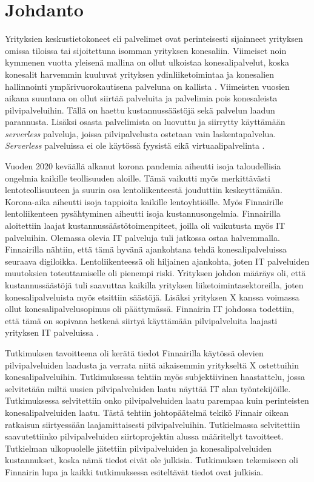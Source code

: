 \chapter{Johdanto\label{johdanto}}
Yrityksien keskustietokoneet eli palvelimet ovat perinteisesti sijainneet yrityksen omissa tiloissa tai sijoitettuna isomman yrityksen konesaliin. Viimeiset noin kymmenen vuotta yleisenä mallina on ollut ulkoistaa konesalipalvelut, koska konesalit harvemmin kuuluvat yrityksen ydinliiketoimintaa ja konesalien hallinnointi ympärivuorokautisena palveluna on kallista \citep{data_center_outsourcing}. Viimeisten vuosien aikana suuntana on ollut siirtää palveluita ja palvelimia pois konesaleista pilvipalveluihin. Tällä on haettu kustannussäästöjä sekä palvelun laadun parannusta. Lisäksi osasta palvelimista on luovuttu ja siirrytty käyttämään \emph{serverless} palveluja, joissa pilvipalvelusta ostetaan vain laskentapalvelua. \emph{Serverless} palveluissa ei ole käytössä fyysistä eikä virtuaalipalvelinta \citep{serverless_computing}.


Vuoden 2020 keväällä alkanut korona pandemia aiheutti isoja taloudellisia ongelmia kaikille teollisuuden aloille. Tämä vaikutti myös merkittävästi lentoteollisuuteen ja suurin osa lentoliikenteestä jouduttiin keskeyttämään. Korona-aika aiheutti isoja tappioita kaikille lentoyhtiöille. Myös Finnairille lentoliikenteen pysähtyminen aiheutti isoja kustannusongelmia. Finnairilla aloitettiin laajat kustannussäästötoimenpiteet, joilla oli vaikutusta myös IT palveluihin. Olemassa olevia IT palveluja tuli jatkossa ostaa halvemmalla. Finnairilla nähtiin, että tämä hyvänä ajankohtana tehdä konesalipalveluissa seuraava digiloikka. Lentoliikenteessä oli hiljainen ajankohta, joten IT palveluiden muutoksien toteuttamiselle oli pienempi riski. Yrityksen johdon määräys oli, että kustannussäästöjä tuli saavuttaa kaikilla yrityksen liiketoimintasektoreilla, joten konesalipalveluista myös etsittiin säästöjä. Lisäksi yrityksen X kanssa voimassa ollut konesalipalvelusopimus oli päättymässä. Finnairin IT johdossa todettiin, että tämä on sopivana hetkenä siirtyä käyttämään pilvipalveluita laajasti yrityksen IT palveluissa \citep{finnair_use_ibm}.

Tutkimuksen tavoitteena oli kerätä tiedot Finnairilla käytössä olevien pilvipalveluiden laadusta ja verrata niitä aikaisemmin yritykseltä X ostettuihin konesalipalveluihin. Tutkimuksessa tehtiin myös subjektiivinen haastattelu, jossa selvitetään miltä uusien pilvipalveluiden laatu näyttää IT alan työntekijöille. Tutkimuksessa selvitettiin onko pilvipalveluiden laatu parempaa kuin perinteisten konesalipalveluiden laatu. Tästä tehtiin johtopäätelmä tekikö Finnair oikean ratkaisun siirtyessään laajamittaisesti pilvipalveluihin. Tutkielmassa selvitettiin saavutettiinko pilvipalveluiden siirtoprojektin alussa määritellyt tavoitteet. Tutkielman ulkopuolelle jätettiin pilvipalveluiden ja konesalipalveluiden kustannukset, koska nämä tiedot eivät ole julkisia. Tutkimuksen tekemiseen oli Finnairin lupa ja kaikki tutkimuksessa esiteltävät tiedot ovat julkisia.

